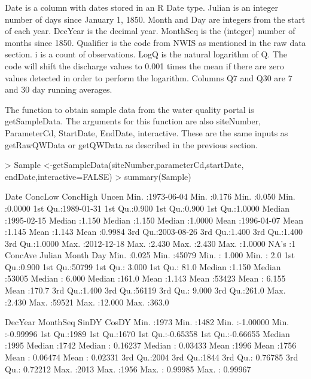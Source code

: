 \documentclass[a4paper,11pt]{article}
\begin{document}
Date is a column with dates stored in an R Date type. Julian is an integer number of days since January 1, 1850.  Month and Day are integers from the start of each year. DecYear is the decimal year. MonthSeq is the (integer) number of months since 1850. Qualifier is the code from NWIS as mentioned in the raw data section. i is a count of observations.  LogQ is the natural logarithm of Q. The code will shift the discharge values to 0.001 times the mean if there are zero values detected in order to perform the logarithm. Columns Q7 and Q30 are 7 and 30 day running averages. 

The function to obtain sample data from the water quality portal is getSampleData. The arguments for this function are also siteNumber, ParameterCd, StartDate, EndDate, interactive. These are the same inputs as getRawQWData or getQWData as described in the previous section.

\begin{Schunk}
\begin{Sinput}
> Sample <-getSampleData(siteNumber,parameterCd,startDate, endDate,interactive=FALSE)
> summary(Sample)
\end{Sinput}
\begin{Soutput}
      Date               ConcLow         ConcHigh         Uncen       
 Min.   :1973-06-04   Min.   :0.176   Min.   :0.050   Min.   :0.0000  
 1st Qu.:1989-01-31   1st Qu.:0.900   1st Qu.:0.900   1st Qu.:1.0000  
 Median :1995-02-15   Median :1.150   Median :1.150   Median :1.0000  
 Mean   :1996-04-07   Mean   :1.145   Mean   :1.143   Mean   :0.9984  
 3rd Qu.:2003-08-26   3rd Qu.:1.400   3rd Qu.:1.400   3rd Qu.:1.0000  
 Max.   :2012-12-18   Max.   :2.430   Max.   :2.430   Max.   :1.0000  
                      NA's   :1                                       
    ConcAve          Julian          Month             Day       
 Min.   :0.025   Min.   :45079   Min.   : 1.000   Min.   :  2.0  
 1st Qu.:0.900   1st Qu.:50799   1st Qu.: 3.000   1st Qu.: 81.0  
 Median :1.150   Median :53005   Median : 6.000   Median :161.0  
 Mean   :1.143   Mean   :53423   Mean   : 6.155   Mean   :170.7  
 3rd Qu.:1.400   3rd Qu.:56119   3rd Qu.: 9.000   3rd Qu.:261.0  
 Max.   :2.430   Max.   :59521   Max.   :12.000   Max.   :363.0  
                                                                 
    DecYear        MonthSeq        SinDY              CosDY         
 Min.   :1973   Min.   :1482   Min.   :-1.00000   Min.   :-0.99996  
 1st Qu.:1989   1st Qu.:1670   1st Qu.:-0.65358   1st Qu.:-0.66655  
 Median :1995   Median :1742   Median : 0.16237   Median : 0.03433  
 Mean   :1996   Mean   :1756   Mean   : 0.06474   Mean   : 0.02331  
 3rd Qu.:2004   3rd Qu.:1844   3rd Qu.: 0.76785   3rd Qu.: 0.72212  
 Max.   :2013   Max.   :1956   Max.   : 0.99985   Max.   : 0.99967  
\end{Soutput}
\end{Schunk}
\end{document}

